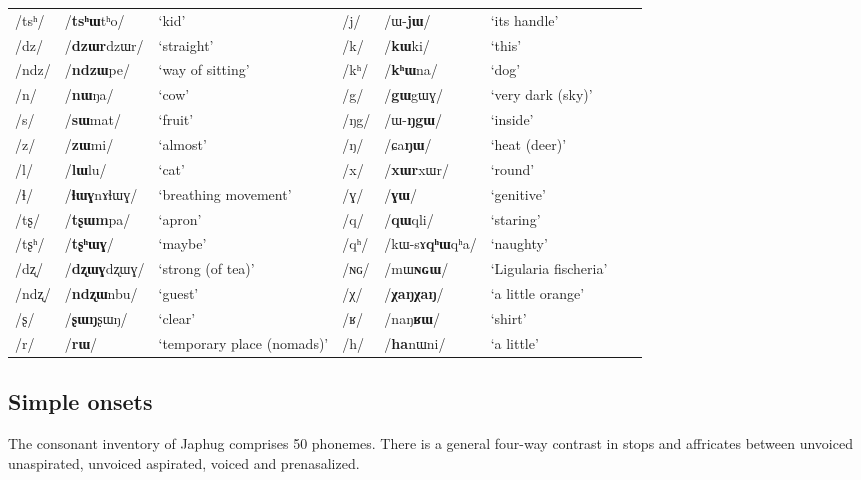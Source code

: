 \documentclass[12pt]{article}
\newcommand{\ipa}[1]{\mbox{\phon/#1/}}
\begin{document}
\begin{table}[H]
{\begin{tabular}{lll|lllll}
 \ipa{tsʰ} & 	  \ipa{\textbf{tsʰɯ}tʰo}   & 	 `kid' & \ipa{j} & 	\ipa{ɯ-\textbf{jɯ}}   & 	 `its handle' \\ 
 \ipa{dz} & 	  \ipa{\textbf{dzɯr}dzɯr}   & 	 `straight' & \ipa{k} & 	\ipa{\textbf{kɯ}ki}   & 	 `this' \\ 
 \ipa{ndz} & 	  \ipa{\textbf{ndzɯ}pe}   & 	 `way of sitting' & \ipa{kʰ} & 	\ipa{\textbf{kʰɯ}na}   & 	 `dog' \\ 
 \ipa{n} & 	  \ipa{\textbf{nɯ}ŋa}   & 	 `cow' & \ipa{g} & 	\ipa{\textbf{gɯ}gɯɣ}   & 	 `very dark (sky)' \\ 
 \ipa{s} & 	  \ipa{\textbf{sɯ}mat}   & 	 `fruit' & \ipa{ŋg} & 	\ipa{ɯ-\textbf{ŋgɯ}}   & 	 `inside' \\ 
 \ipa{z} & 	  \ipa{\textbf{zɯ}mi}   & 	 `almost' & \ipa{ŋ} & 	\ipa{ɕa\textbf{ŋɯ}}   & 	 `heat (deer)' \\ 
 \ipa{l} & 	  \ipa{\textbf{lɯ}lu}   & 	 `cat' & \ipa{x} & 	\ipa{\textbf{xɯr}xɯr}   & 	 `round' \\ 
 \ipa{ɬ} & 	  \ipa{\textbf{ɬɯɣ}nɤɬɯɣ}   & 	 `breathing movement' & \ipa{ɣ} & 	\ipa{\textbf{ɣɯ}}   & 	 `genitive' \\ 
 \ipa{tʂ} & 	 \ipa{\textbf{tʂɯm}pa}   & 	 `apron' & \ipa{q} & 	\ipa{\textbf{qɯ}qli}   & 	 `staring' \\ 
 \ipa{tʂʰ} & 	  \ipa{\textbf{tʂʰɯɣ}}   & 	 `maybe' & \ipa{qʰ} & 	\ipa{kɯ-sɤ\textbf{qʰɯ}qʰa}   & 	 `naughty' \\ 
 \ipa{dʐ} & 	\ipa{\textbf{dʐɯɣ}dʐɯɣ}   & 	 `strong (of tea)' & \ipa{ɴɢ} & 	\ipa{mɯ\textbf{ɴɢɯ}}  & 	 `Ligularia fischeria' \\ 
 \ipa{ndʐ} & 	\ipa{\textbf{ndʐɯ}nbu}   & 	 `guest' & \ipa{χ} & 	\ipa{\textbf{χaŋχaŋ}}   & 	 `a little orange' \\ 
 \ipa{ʂ} & 	\ipa{\textbf{ʂɯŋ}ʂɯŋ}   & 	 `clear' & \ipa{ʁ} & 	\ipa{naŋ\textbf{ʁɯ}}   & 	 `shirt' \\ 
 \ipa{r} & 	\ipa{\textbf{rɯ}}   & 	 `temporary place (nomads)' & 	  \ipa{h}&\ipa{\textbf{ha}nɯni} 	 & `a little'	 \\ 
\end{tabular}}
\end{table}

 \subsection*{Simple onsets} \label{sec:simple}

 The consonant inventory of Japhug comprises 50 phonemes. There is a general four-way contrast in stops and affricates between unvoiced unaspirated, unvoiced aspirated, voiced and prenasalized.
 
\end{document}
